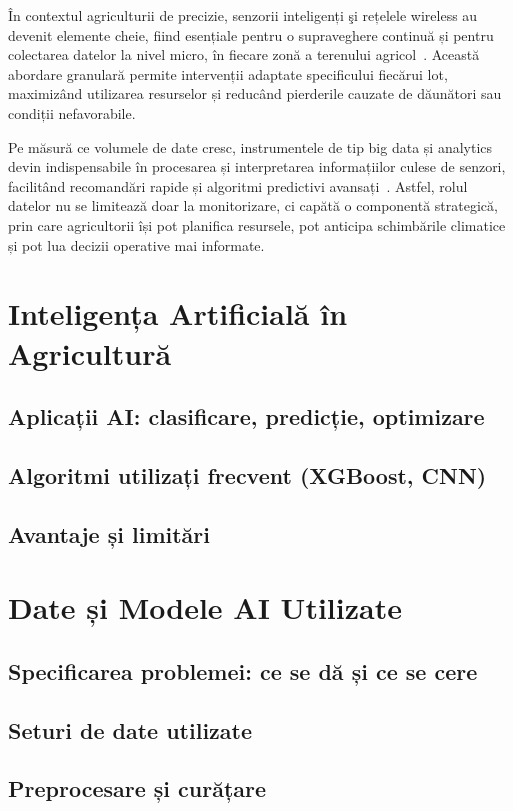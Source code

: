 \documentclass[runningheads,a4paper,11pt,twoside]{report}
\begin{document}
În contextul agriculturii de precizie, senzorii inteligenți şi rețelele wireless au devenit elemente cheie, fiind esențiale pentru o supraveghere continuă și pentru colectarea datelor la nivel micro, în fiecare zonă a terenului agricol~\cite{soussi2024_smartsensors}. Această abordare granulară permite intervenții adaptate specificului fiecărui lot, maximizând utilizarea resurselor și reducând pierderile cauzate de dăunători sau condiții nefavorabile.

Pe măsură ce volumele de date cresc, instrumentele de tip big data și analytics devin indispensabile în procesarea și interpretarea informațiilor culese de senzori, facilitând recomandări rapide și algoritmi predictivi avansați~\cite{alahmad2023_iot_bigdata}. Astfel, rolul datelor nu se limitează doar la monitorizare, ci capătă o componentă strategică, prin care agricultorii își pot planifica resursele, pot anticipa schimbările climatice și pot lua decizii operative mai informate.


\chapter{Inteligența Artificială în Agricultură}
\section{Aplicații AI: clasificare, predicție, optimizare}
\section{Algoritmi utilizați frecvent (XGBoost, CNN)}
\section{Avantaje și limitări}

\chapter{Date și Modele AI Utilizate}
\section{Specificarea problemei: ce se dă și ce se cere}
\section{Seturi de date utilizate}
\section{Preprocesare și curățare}
\end{document}
